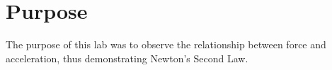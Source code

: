 
\section{Purpose}
\vspace{-0.5cm}
\singlespacing
The purpose of this lab was to observe the relationship between force and acceleration, thus demonstrating Newton's Second Law.

